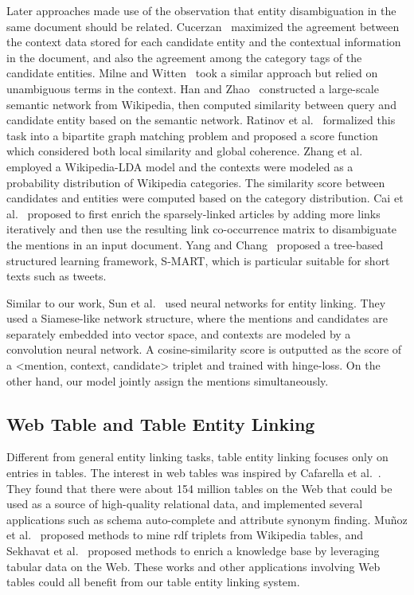 Later approaches made use of the observation that entity disambiguation in the same document should be related. Cucerzan~\cite{cucerzan2007large-scale} maximized the agreement between the context data stored for each candidate entity and the contextual information in the document, and also the agreement among the category tags of the candidate entities. Milne and Witten~\cite{milne2008learning} took a similar approach but relied on unambiguous terms in the context. Han and Zhao~\cite{han2009named} constructed a large-scale semantic network from Wikipedia, then computed similarity between query and candidate entity based on the semantic network. Ratinov et al.~\cite{ratinov2011local} formalized this task into a bipartite graph matching problem and proposed a score function which considered both local similarity and global coherence. Zhang et al.~\cite{zhang2011wikipedia} employed a Wikipedia-LDA model and the contexts were modeled as a probability distribution of Wikipedia categories. The similarity score between candidates and entities were computed based on the category distribution. 
Cai et al.~\cite{cai2013wikification} proposed to first enrich the sparsely-linked articles by adding more links iteratively and then use the resulting link co-occurrence matrix to disambiguate the mentions in an input document. Yang and Chang~\cite{yang2016s-mart:} proposed a tree-based structured learning framework, S-MART, which is particular suitable for short texts such as tweets. 

Similar to our work, Sun et al.~\cite{sun2015modeling} used neural networks for entity linking. They used a Siamese-like network structure, where the mentions and candidates are separately embedded into vector space,  and contexts are modeled by a convolution neural network. 
A cosine-similarity score is outputted as the score of a <mention, context, candidate> triplet and trained with hinge-loss. On the other hand, our model jointly assign the mentions simultaneously.

\subsection{Web Table and Table Entity Linking}
\label{sec:wt}
Different from general entity linking tasks, table entity linking focuses only on entries in tables. The interest in web tables was inspired by Cafarella et al.~\cite{cafarella2008webtables}. They found that there were about 154 million tables on the Web that could be used as a source of high-quality relational data, and implemented several applications such as schema auto-complete and attribute synonym finding. Mu{\~n}oz et al.~\cite{munoz2014using} proposed methods to mine rdf triplets from Wikipedia tables, and Sekhavat et al.~\cite{sekhavat2014knowledge} proposed methods to enrich a knowledge base by leveraging tabular data on the Web. These works and other applications involving Web tables could all benefit from our table entity linking system.

